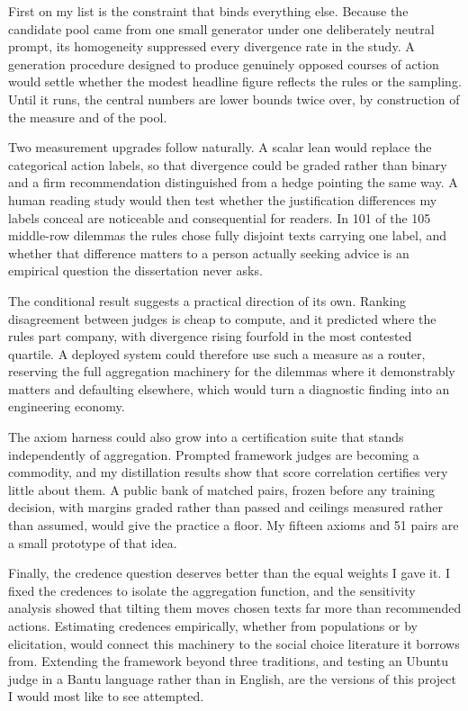\documentclass[11pt,a4paper]{article}
\begin{document}
First on my list is the constraint that binds everything else. Because the candidate pool came from one small generator under one deliberately neutral prompt, its homogeneity suppressed every divergence rate in the study. A generation procedure designed to produce genuinely opposed courses of action would settle whether the modest headline figure reflects the rules or the sampling. Until it runs, the central numbers are lower bounds twice over, by construction of the measure and of the pool.

Two measurement upgrades follow naturally. A scalar lean would replace the categorical action labels, so that divergence could be graded rather than binary and a firm recommendation distinguished from a hedge pointing the same way. A human reading study would then test whether the justification differences my labels conceal are noticeable and consequential for readers. In 101 of the 105 middle-row dilemmas the rules chose fully disjoint texts carrying one label, and whether that difference matters to a person actually seeking advice is an empirical question the dissertation never asks.

The conditional result suggests a practical direction of its own. Ranking disagreement between judges is cheap to compute, and it predicted where the rules part company, with divergence rising fourfold in the most contested quartile. A deployed system could therefore use such a measure as a router, reserving the full aggregation machinery for the dilemmas where it demonstrably matters and defaulting elsewhere, which would turn a diagnostic finding into an engineering economy.

The axiom harness could also grow into a certification suite that stands independently of aggregation. Prompted framework judges are becoming a commodity, and my distillation results show that score correlation certifies very little about them. A public bank of matched pairs, frozen before any training decision, with margins graded rather than passed and ceilings measured rather than assumed, would give the practice a floor. My fifteen axioms and 51 pairs are a small prototype of that idea.

Finally, the credence question deserves better than the equal weights I gave it. I fixed the credences to isolate the aggregation function, and the sensitivity analysis showed that tilting them moves chosen texts far more than recommended actions. Estimating credences empirically, whether from populations or by elicitation, would connect this machinery to the social choice literature it borrows from. Extending the framework beyond three traditions, and testing an Ubuntu judge in a Bantu language rather than in English, are the versions of this project I would most like to see attempted.
\end{document}
